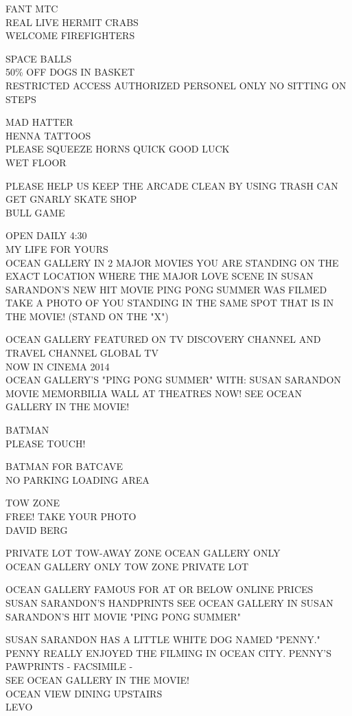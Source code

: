 \documentclass[10pt,letterpaper]{article}
\begin{document}
FANT MTC\\
REAL LIVE HERMIT CRABS\\
WELCOME FIREFIGHTERS

SPACE BALLS\\
50\% OFF DOGS IN BASKET\\
RESTRICTED ACCESS AUTHORIZED PERSONEL ONLY NO SITTING ON STEPS

MAD HATTER\\
HENNA TATTOOS\\
PLEASE SQUEEZE HORNS QUICK GOOD LUCK\\
WET FLOOR

PLEASE HELP US KEEP THE ARCADE CLEAN BY USING TRASH CAN\\
GET GNARLY SKATE SHOP\\
BULL GAME

OPEN DAILY 4:30\\
MY LIFE FOR YOURS\\
OCEAN GALLERY IN 2 MAJOR MOVIES YOU ARE STANDING ON THE EXACT LOCATION WHERE THE MAJOR LOVE SCENE IN SUSAN SARANDON'S NEW HIT MOVIE PING PONG SUMMER WAS FILMED TAKE A PHOTO OF YOU STANDING IN THE SAME SPOT THAT IS IN THE MOVIE!  (STAND ON THE "X")

OCEAN GALLERY FEATURED ON TV DISCOVERY CHANNEL AND TRAVEL CHANNEL GLOBAL TV\\
NOW IN CINEMA 2014\\
OCEAN GALLERY'S "PING PONG SUMMER" WITH: SUSAN SARANDON MOVIE MEMORBILIA WALL AT THEATRES NOW!  SEE OCEAN GALLERY IN THE MOVIE!

BATMAN\\
PLEASE TOUCH!

BATMAN FOR BATCAVE\\
NO PARKING LOADING AREA

TOW ZONE\\
FREE!  TAKE YOUR PHOTO\\
DAVID BERG

PRIVATE LOT TOW{-}AWAY ZONE OCEAN GALLERY ONLY\\
OCEAN GALLERY ONLY TOW ZONE PRIVATE LOT

OCEAN GALLERY FAMOUS FOR AT OR BELOW ONLINE PRICES\\
SUSAN SARANDON'S HANDPRINTS SEE OCEAN GALLERY IN SUSAN SARANDON'S HIT MOVIE "PING PONG SUMMER"

SUSAN SARANDON HAS A LITTLE WHITE DOG NAMED "PENNY."  PENNY REALLY ENJOYED THE FILMING IN OCEAN CITY.  PENNY'S PAWPRINTS {-} FACSIMILE {-}\\
SEE OCEAN GALLERY IN THE MOVIE!\\
OCEAN VIEW DINING UPSTAIRS\\
LEVO
\end{document}
